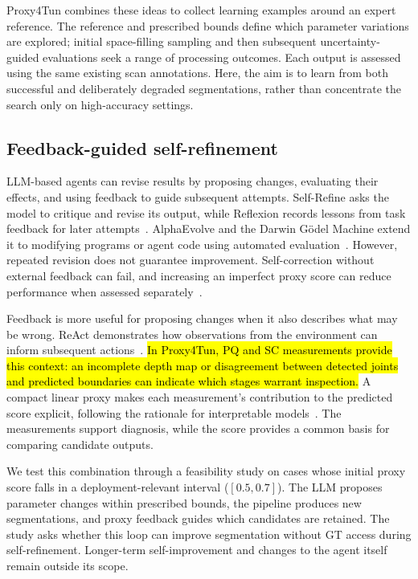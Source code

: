 \documentclass[a4paper,fleqn]{cas-dc}
\begin{document}
{Proxy4Tun combines these ideas to collect learning examples around an expert reference. The reference and prescribed bounds define which parameter variations are explored; initial space-filling sampling and then subsequent uncertainty-guided evaluations seek a range of processing outcomes. Each output is assessed using the same existing scan annotations. Here, the aim is to learn from both successful and deliberately degraded segmentations, rather than concentrate the search only on high-accuracy settings.

\subsection{Feedback-guided self-refinement}

LLM-based agents can revise results by proposing changes, evaluating their effects, and using feedback to guide subsequent attempts. Self-Refine asks the model to critique and revise its output, while Reflexion records lessons from task feedback for later attempts~\cite{madaan2023selfrefine,shinn2023reflexion}. AlphaEvolve and the Darwin G\"odel Machine extend it to modifying programs or agent code using automated evaluation~\cite{novikov2025alphaevolve,zhang2025darwin}. However, repeated revision does not guarantee improvement. Self-correction without external feedback can fail, and increasing an imperfect proxy score can reduce performance when assessed separately~\cite{huang2024selfcorrect,gao2023overoptimization}.

Feedback is more useful for proposing changes when it also describes what may be wrong. ReAct demonstrates how observations from the environment can inform subsequent actions~\cite{yao2023react}. \hl{In Proxy4Tun, PQ and SC measurements provide this context: an incomplete depth map or disagreement between detected joints and predicted boundaries can
indicate which stages warrant inspection.} A compact linear proxy makes each measurement's contribution to the predicted score explicit, following the rationale for interpretable models~\cite{rudin2019stop}. The measurements support diagnosis, while the score provides a common basis for comparing candidate outputs.

We test this combination through a feasibility study on cases whose initial proxy score falls in a deployment-relevant interval ($[0.5,0.7]$). The LLM proposes parameter changes within prescribed bounds, the pipeline produces new segmentations, and proxy feedback guides which candidates are retained. The study asks whether this loop can improve segmentation without GT access during self-refinement. Longer-term self-improvement and changes to the agent itself remain outside its scope.

}
\end{document}
